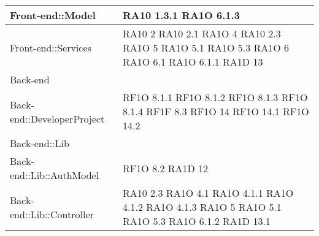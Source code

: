 \begin{center}
\begin{longtable}{|p{5cm}|p{3cm}|}
		Front-end::Model & RA10 1.3.1 \newline RA1O 6.1.3 \\ \hline
		
		Front-end::Services & RA10 2 \newline RA10 2.1 \newline RA1O 4 \newline RA10 2.3 \newline RA1O 5 \newline RA1O 5.1 \newline RA1O 5.3 \newline	RA1O 6 \newline 
		RA1O 6.1 \newline RA1O 6.1.1 \newline RA1D 13 \newline
		\\ \hline
	
	Back-end & \\ \hline
	
		Back-end::DeveloperProject & RF1O 8.1.1 \newline RF1O 8.1.2 \newline RF1O 8.1.3 RF1O 8.1.4 \newline RF1F 8.3 \newline RF1O 14 \newline
		RF1O 14.1 \newline RF1O 14.2 \newline 
		 \\ \hline
		
		Back-end::Lib & \\ \hline
		
			Back-end::Lib::AuthModel & RF1O 8.2 \newline RA1D 12 \newline 			\\ \hline
			
			Back-end::Lib::Controller & RA10 2.3 \newline RA1O 4.1 \newline RA1O 4.1.1 \newline RA1O 4.1.2 \newline  RA1O 4.1.3 \newline RA1O 5 \newline RA1O 5.1 \newline RA1O 5.3 \newline RA1O 6.1.2 \newline  RA1D 13.1
			 	\\ \hline
			

\end{longtable}
\end{center}
